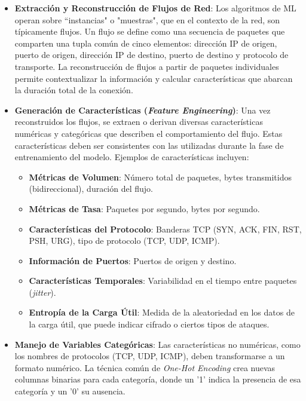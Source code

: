 \begin{itemize}
   
    \item\textbf{Extracción y Reconstrucción de Flujos de Red}: Los algoritmos de ML operan sobre ``instancias" o "muestras", que en el contexto de la red, son típicamente flujos. Un flujo se define como una secuencia de paquetes que comparten una tupla común de cinco elementos: dirección IP de origen, puerto de origen, dirección IP de destino, puerto de destino y protocolo de transporte. La reconstrucción de flujos a partir de paquetes individuales permite contextualizar la información y calcular características que abarcan la duración total de la conexión.
    
     \item\textbf{Generación de Características (\textit{Feature Engineering})}: Una vez reconstruidos los flujos, se extraen o derivan diversas características numéricas y categóricas que describen el comportamiento del flujo. Estas características deben ser consistentes con las utilizadas durante la fase de entrenamiento del modelo. Ejemplos de características incluyen:
    \begin{itemize}
         \item\textbf{Métricas de Volumen}: Número total de paquetes, bytes transmitidos (bidireccional), duración del flujo.
        
         \item\textbf{Métricas de Tasa}: Paquetes por segundo, bytes por segundo.
        
         \item\textbf{Características del Protocolo}: Banderas TCP (SYN, ACK, FIN, RST, PSH, URG), tipo de protocolo (TCP, UDP, ICMP).
        
         \item\textbf{Información de Puertos}: Puertos de origen y destino.
        
         \item\textbf{Características Temporales}: Variabilidad en el tiempo entre paquetes (\textit{jitter}).
        
         \item\textbf{Entropía de la Carga Útil}: Medida de la aleatoriedad en los datos de la carga útil, que puede indicar cifrado o ciertos tipos de ataques.
    \end{itemize}
    
     \item\textbf{Manejo de Variables Categóricas}: Las características no numéricas, como los nombres de protocolos (TCP, UDP, ICMP), deben transformarse a un formato numérico. La técnica común de \textit{One-Hot Encoding} crea nuevas columnas binarias para cada categoría, donde un '1' indica la presencia de esa categoría y un '0' su ausencia.
    

\end{itemize}
